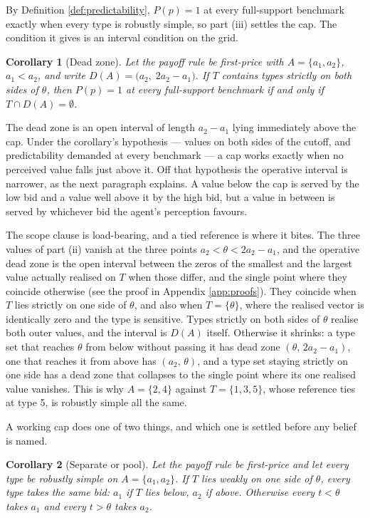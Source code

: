 \documentclass[12pt]{article}
\newtheorem{corollary}{Corollary}
\theoremstyle{definition}
\begin{document}
By Definition \ref{def:predictability}, $P(p) = 1$ at every full-support benchmark exactly when every type is robustly simple, so part (iii) settles the cap. The condition it gives is an interval condition on the grid.

\begin{corollary}[Dead zone]\label{cor:deadzone}
Let the payoff rule be first-price with $A = \{a_1, a_2\}$, $a_1 < a_2$, and write $D(A) = \bigl(a_2,\; 2a_2 - a_1\bigr)$. If $T$ contains types strictly on both sides of $\theta$, then $P(p) = 1$ at every full-support benchmark if and only if $T \cap D(A) = \emptyset$.
\end{corollary}

The dead zone is an open interval of length $a_2 - a_1$ lying immediately above the cap. Under the corollary's hypothesis --- values on both sides of the cutoff, and predictability demanded at every benchmark --- a cap works exactly when no perceived value falls just above it. Off that hypothesis the operative interval is narrower, as the next paragraph explains. A value below the cap is served by the low bid and a value well above it by the high bid, but a value in between is served by whichever bid the agent's perception favours.

The scope clause is load-bearing, and a tied reference is where it bites. The three values of part (ii) vanish at the three points $a_2 < \theta < 2a_2 - a_1$, and the operative dead zone is the open interval between the zeros of the smallest and the largest value actually realised on $T$ when those differ, and the single point where they coincide otherwise (see the proof in Appendix \ref{app:proofs}). They coincide when $T$ lies strictly on one side of $\theta$, and also when $T = \{\theta\}$, where the realised vector is identically zero and the type is sensitive. Types strictly on both sides of $\theta$ realise both outer values, and the interval is $D(A)$ itself. Otherwise it shrinks: a type set that reaches $\theta$ from below without passing it has dead zone $(\theta,\, 2a_2 - a_1)$, one that reaches it from above has $(a_2,\, \theta)$, and a type set staying strictly on one side has a dead zone that collapses to the single point where its one realised value vanishes. This is why $A = \{2,4\}$ against $T = \{1,3,5\}$, whose reference ties at type 5, is robustly simple all the same.

A working cap does one of two things, and which one is settled before any belief is named.

\begin{corollary}[Separate or pool]\label{cor:sepool}
Let the payoff rule be first-price and let every type be robustly simple on $A = \{a_1, a_2\}$. If $T$ lies weakly on one side of $\theta$, every type takes the same bid: $a_1$ if $T$ lies below, $a_2$ if above. Otherwise every $t < \theta$ takes $a_1$ and every $t > \theta$ takes $a_2$.
\end{corollary}
\end{document}
